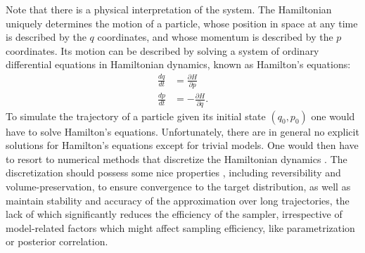 \documentclass[12pt]{report}
\begin{document}
Note that there is a physical interpretation of the system. The Hamiltonian uniquely determines the motion of a particle, whose position in space at any time is described by the $q$ coordinates, and whose momentum is described by the $p$ coordinates. Its motion can be described by solving a system of ordinary differential equations in Hamiltonian dynamics, known as Hamilton's equations:
\begin{align*}
    \frac{dq}{dt} &= \frac{\partial H}{\partial p } \\
    \frac{dp}{dt} &= -\frac{\partial H}{\partial q}.
\end{align*}
To simulate the trajectory of a particle given its initial state $(q_0,p_0)$ one
would have to solve Hamilton's equations. Unfortunately, there are in general no
explicit solutions for Hamilton's equations except for trivial models. One would
then have to resort to numerical methods that discretize the Hamiltonian
dynamics \cite{leimkuhler2004simulating}. The discretization should
possess some nice properties , including reversibility and volume-preservation, to ensure convergence to the target distribution, as well as  maintain 
stability and accuracy of the approximation over long trajectories, the lack of which significantly reduces the efficiency of the sampler, irrespective of model-related factors which might affect sampling efficiency, like parametrization or posterior correlation.  
\end{document}
